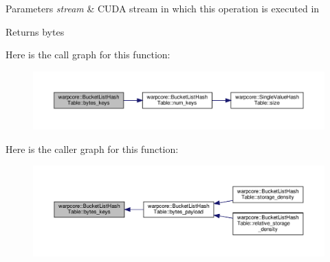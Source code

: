 \begin{DoxyParams}{Parameters}
{\em stream} & C\+U\+DA stream in which this operation is executed in \\
\hline
\end{DoxyParams}
\begin{DoxyReturn}{Returns}
bytes 
\end{DoxyReturn}
Here is the call graph for this function\+:
\nopagebreak
\begin{figure}[H]
\begin{center}
\leavevmode
\includegraphics[width=350pt]{classwarpcore_1_1BucketListHashTable_a6f8e4a83670a301f53e923d2fe9a3507_cgraph}
\end{center}
\end{figure}
Here is the caller graph for this function\+:
\nopagebreak
\begin{figure}[H]
\begin{center}
\leavevmode
\includegraphics[width=350pt]{classwarpcore_1_1BucketListHashTable_a6f8e4a83670a301f53e923d2fe9a3507_icgraph}
\end{center}
\end{figure}
\mbox{\label{classwarpcore_1_1BucketListHashTable_a3ac40e9655bfc27d3f21e0ea38b3d29d}} 
